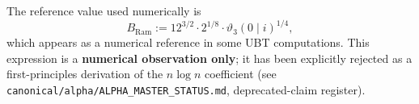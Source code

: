 \documentclass[12pt,a4paper]{article}
\theoremstyle{definition}
\theoremstyle{remark}
\newcommand{\BRam}{B_{\mathrm{Ram}}}
\begin{document}
The reference value used numerically is
\begin{equation}
  \BRam := 12^{3/2} \cdot 2^{1/8} \cdot \vartheta_3(0\mid i)^{1/4},
  \label{eq:BRam}
\end{equation}
which appears as a numerical reference in some UBT computations.
This expression is a \textbf{numerical observation only}; it has been explicitly
rejected as a first-principles derivation of the $n\log n$ coefficient
(see \texttt{canonical/alpha/ALPHA\_MASTER\_STATUS.md}, deprecated-claim register).

\ifdefined\INCLUDEMODE
\else
  
\end{document}
